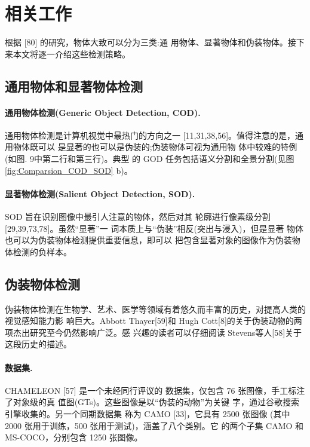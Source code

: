 \documentclass[final]{cvpr}
\newcommand{\mypara}[1]{\paragraph{#1.}}
\renewcommand{\figref}[1]{图\ref{#1}}
\begin{document}
\section{相关工作}
\label{sec:RelatedWorks}
根据 [80] 的研究，物体大致可以分为三类:通 用物体、显著物体和伪装物体。接下来本文将逐一介绍这些检测策略。
\subsection{通用物体和显著物体检测}
\mypara{通用物体检测(Generic Object Detection, COD)} 通用物体检测是计算机视觉中最热门的方向之一 [11,31,38,56]。值得注意的是，通用物体既可以 是显著的也可以是伪装的;伪装物体可视为通用物 体中较难的特例(如图. 9中第二行和第三行)。典型 的 GOD 任务包括语义分割和全景分割(见\figref{fig:Comparsion_COD_SOD} b)。
\mypara{显著物体检测(Salient Object Detection, SOD)}SOD 旨在识别图像中最引人注意的物体，然后对其 轮廓进行像素级分割 [29,39,73,78]。虽然“显著”一 词本质上与“伪装”相反(突出与浸入)，但是显著 物体也可以为伪装物体检测提供重要信息，即可以 把包含显著对象的图像作为伪装物体检测的负样本。
\begin{table}
    \caption{从 COD 数据集对比信息来看，COD10K 数据集提 供了更丰富的注释标签。数量(Img.):图片数。类(Cls.): 类别。Att.:属性。BBox.;包围盒。Ml.:抠图 [74] 级标注
(图. 7)。Ins.:实例级标签。Cate.:类别标签。Spi.:显式拆 分训练集与测试集。Obj.:物体。}\label{tab:COD_Dataset}
\end{table}



\subsection{伪装物体检测}
伪装物体检测在生物学、艺术、医学等领域有着悠久而丰富的历史，对提高人类的视觉感知能力影 响巨大。Abbott Thayer[59]和 Hugh Cott[8]的关于伪装动物的两项杰出研究至今仍然影响广泛。感 兴趣的读者可以仔细阅读 Stevens等人[58]关于这段历史的描述。\mypara{数据集}CHAMELEON [57] 是一个未经同行评议的 数据集，仅包含 76 张图像，手工标注了对象级的真 值图(GTs)。这些图像是以“伪装的动物”为关键 字，通过谷歌搜索引擎收集的。另一个同期数据集 称为 CAMO [33]，它具有 2500 张图像 (其中 2000 张用于训练，500 张用于测试)，涵盖了八个类别。它 的两个子集 CAMO 和 MS-COCO，分别包含 1250 张图像。
\end{document}
